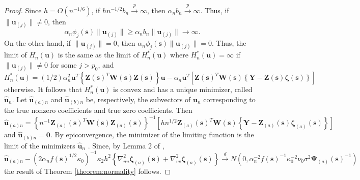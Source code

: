 \documentclass[authoryear,review, 12pt]{elsarticle}
\begin{document}
\begin{proof}
Since $h=O(n^{-1/6})$, if $hn^{-1/2}b_{n}\xrightarrow{p}\infty$,
then $\alpha_{n}b_{n}\xrightarrow{p}\infty$. Thus, if $\|\bm{u}_{(j)}\|\ne0$,
then 
\[
\alpha_{n}\phi_{j}(\bm{s})\|\bm{u}_{(j)}\|\ge\alpha_{n}b_{n}\|\bm{u}_{(j)}\|\to\infty.
\]
On the other hand, if $\|\bm{u}_{(j)}\|=0$, then $\alpha_{n}\phi_{j}(\bm{s})\|\bm{u}_{(j)}\|=0$.
Thus, the limit of $H_{n}(\bm{u})$ is the same as the limit of $H_{n}^{*}(\bm{u})$
where $H_{n}^{*}(\bm{u})=\infty$ if $\|\bm{u}_{(j)}\|\ne0$ for some
$j>p_{0}$, and 
\[
H_{n}^{*}(\bm{u})=(1/2)\alpha_{n}^{2}\bm{u}^{T}\left\{ \bm{Z}(\bm{s})^{T}\bm{W}\!(\bm{s})\bm{Z}(\bm{s})\right\} \bm{u}-\alpha_{n}\bm{u}^{T}\left[\bm{Z}(\bm{s})^{T}\bm{W}\!(\bm{s})\left\{ \bm{Y}-\bm{Z}(\bm{s})\bm{\zeta}(\bm{s})\right\} \right]
\]
otherwise. It follows that $H_{n}^{*}(\bm{u})$ is convex and has
a unique minimizer, called $\hat{\bm{u}}_{n}$. Let $\hat{\bm{u}}_{(a)n}$
and $\hat{\bm{u}}_{(b)n}$ be, respectively, the subvectors of $\bm{u}_{n}$
corresponding to the true nonzero coefficients and true zero coefficients.
Then 
\[
\hat{\bm{u}}_{(a)n}=\left\{ n^{-1}\bm{Z}_{(a)}(\bm{s})^{T}\bm{W}\!(\bm{s})\bm{Z}_{(a)}(\bm{s})\right\} ^{-1}\left[hn^{1/2}\bm{Z}_{(a)}(\bm{s})^{T}\bm{W}\!(\bm{s})\left\{ \bm{Y}-\bm{Z}_{(a)}(\bm{s})\bm{\zeta}_{(a)}(\bm{s})\right\} \right]
\]
and $\hat{\bm{u}}_{(b)n}=\bm{0}.$ By epiconvergence, the minimizer
of the limiting function is the limit of the minimizers $\hat{\bm{u}}_{n}$
\citep{Geyer-1994,Knight-Fu-2000}. Since, by Lemma 2 of \citet{Sun-Yan-Zhang-Lu-2014},
\[
\hat{\bm{u}}_{(a)n}-\left(2\alpha_{n}f(\bm{s})^{1/2}\kappa_{0}\right)^{-1}\kappa_{2}h^{2}\left\{ \nabla_{uu}^{2}\bm{\zeta}_{(a)}(\bm{s})+\nabla_{vv}^{2}\bm{\zeta}_{(a)}(\bm{s})\right\} \xrightarrow{d}N\left(0,\alpha_{n}^{-2}f(\bm{s})^{-1}\kappa_{0}^{-2}\nu_{0}\sigma^{2}\bm{\Psi}_{(a)}(\bm{s})^{-1}\right)
\]
the result of Theorem \ref{theorem:normality} follows.
\end{proof}
\end{document}
